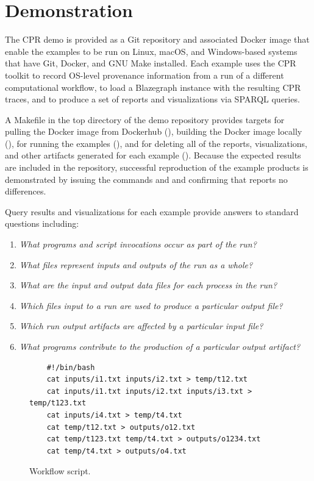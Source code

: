 \section{Demonstration}

The CPR demo is provided as a Git repository and associated Docker image that enable the examples to be run on Linux, macOS, and Windows-based systems that have Git, Docker, and GNU Make installed. Each example uses the CPR toolkit to record OS-level provenance information from a run of a different computational workflow, to load a Blazegraph instance with the resulting CPR traces, and to produce a set of reports and visualizations via SPARQL queries.
 
A Makefile in the top directory of the demo repository provides targets for pulling the Docker image from Dockerhub (), building the Docker image locally (), for running the examples (), and for deleting all of the reports, visualizations, and other artifacts generated for each example (). Because the expected results are included in the repository, successful reproduction of the example products is demonstrated by issuing the commands  and  and confirming that  reports no differences.

Query results and visualizations for each example provide answers to standard questions including:
\begin{enumerate}
\item \emph{What programs and script invocations occur as part of the run?}
\item \emph{What files represent inputs and outputs of the run as a whole?}
\item \emph{What are the input and output data files for each process in the run?}
\item \emph{Which files input to a run are used to produce a particular output file?}
\item \emph{Which run output artifacts are affected by a particular input file?}
\item \emph{What programs contribute to the production of a particular output artifact?}
\end{enumerate}

\begin{figure}[t]
\begin{verbatim}
    #!/bin/bash
    cat inputs/i1.txt inputs/i2.txt > temp/t12.txt
    cat inputs/i1.txt inputs/i2.txt inputs/i3.txt > temp/t123.txt
    cat inputs/i4.txt > temp/t4.txt
    cat temp/t12.txt > outputs/o12.txt
    cat temp/t123.txt temp/t4.txt > outputs/o1234.txt
    cat temp/t4.txt > outputs/o4.txt
\end{verbatim}
\vspace*{-1.5em}  %
        \caption{Workflow script.}
        \label{fig-script}
      \end{figure}

